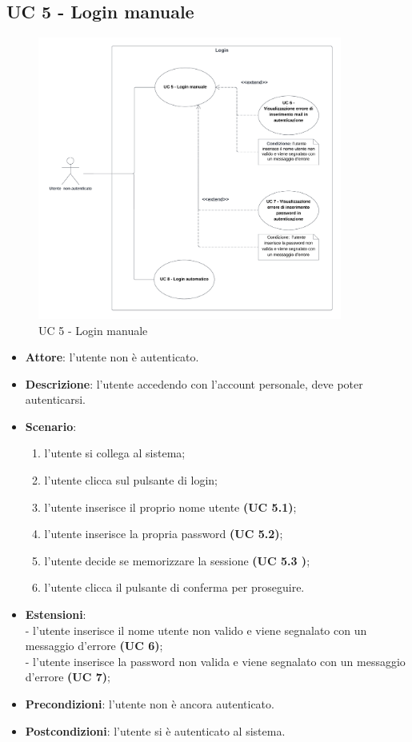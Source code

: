 \subsection{UC 5 - Login manuale}
\begin{figure}[!h]
    \includegraphics[width=10cm]{sezioni/Images/UC5.png}
    \centering
    \caption{UC 5 - Login manuale}
\end{figure}

\begin{itemize}
    \item \textbf{Attore}: l’utente non è autenticato.
    \item \textbf{Descrizione}: l’utente accedendo con l’account personale, deve poter autenticarsi.
    \item \textbf{Scenario}:
    \begin{enumerate}
        \item l’utente si collega al sistema;
        \item l’utente clicca sul pulsante di login;
        \item l’utente inserisce il proprio nome utente \textbf{(UC 5.1)};
        \item l’utente inserisce la propria password \textbf{(UC 5.2)};
        \item l’utente decide se memorizzare la sessione \textbf{(UC 5.3 )};
        \item l’utente clicca il pulsante di conferma per proseguire.
    \end{enumerate}
    \item \textbf{Estensioni}:\\
        - l’utente inserisce il nome utente non valido e viene segnalato con un messaggio d’errore \textbf{(UC 6)};\\
        - l’utente inserisce la password non valida e viene segnalato con un messaggio d’errore \textbf{(UC 7)};\\

    \item \textbf{Precondizioni}: l’utente non è ancora autenticato.
    \item \textbf{Postcondizioni}: l’utente si è autenticato al sistema.
\end{itemize}

